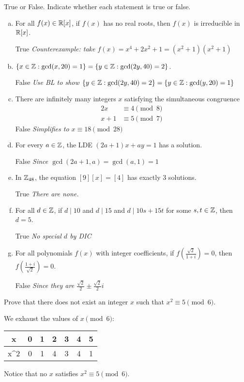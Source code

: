 \documentclass{agony}
\begin{document}
\begin{prob}
  True or False. Indicate whether each statement is true or false.
  \begin{enumerate}[(a)]
    \item For all $f(x) \in \mathbb{R}[x]$, if $f(x)$ has no real roots, then $f(x)$ is irreducible in $\mathbb{R}[x]$.

          True \quad {} \qquad \emph{Counterexample: take $f(x)=x^4+2x^2+1=(x^2+1)(x^2+1)$}
    \item $\{x \in \mathbb{Z} : \gcd(x,20) = 1\} = \{y \in \mathbb{Z} : \gcd(2y,40) = 2\}$.

           \quad False \qquad \emph{Use BL to show $\{y \in \mathbb{Z} : \gcd(2y,40) = 2\}=\{y \in \mathbb{Z} : \gcd(y,20) = 1\}$}
    \item There are infinitely many integers $x$ satisfying the simultaneous congruence
          \begin{align*}
            2x & \equiv 4 \pmod 8 \\ x+1 & \equiv 5 \pmod 7
          \end{align*}
           \quad False \qquad \emph{Simplifies to $x \equiv 18 \pmod{28}$}
    \item For every $a\in\mathbb{Z}$, the LDE $(2a+1)x + ay = 1$ has a solution.

           \quad False \qquad \emph{Since $\gcd(2a+1,a) = \gcd(a,1) = 1$}
    \item In $\mathbb{Z}_{48}$, the equation $[9][x] = [4]$ has exactly 3 solutions.

          True \quad {} \qquad \emph{There are none.}
    \item For all $d \in \mathbb{Z}$, if $d \mid 10$ and $d \mid 15$
          and $d \mid 10s + 15t$ for some $s,t\in\mathbb{Z}$, then $d = 5$.

          True \quad {} \qquad \emph{No special $d$ by DIC}
    \item For all polynomials $f(x)$ with integer coefficients, if $f(\frac{\sqrt{2}}{1+i}) = 0$,
          then $f(\frac{1+i}{\sqrt{2}}) = 0$.

           \quad False \qquad \emph{Since they are $\frac{\sqrt{2}}{2} \pm \frac{\sqrt{2}}{2}i$}
  \end{enumerate}
\end{prob}

\begin{prob}
  Prove that there does not exist an integer $x$ such that $x^2 \equiv 5 \pmod 6$.
\end{prob}
\begin{prf}
  We exhaust the values of $x \pmod 6$:
  \begin{center}
    \begin{tabular}{C|C|C|C|C|C|C}
      x    & 0 & 1 & 2 & 3 & 4 & 5 \\ \hline
      x^2  & 0 & 1 & 4 & 3 & 4 & 1
    \end{tabular}
  \end{center}
  Notice that no $x$ satisfies $x^2 \equiv 5 \pmod 6$.
\end{prf}
\end{document}

